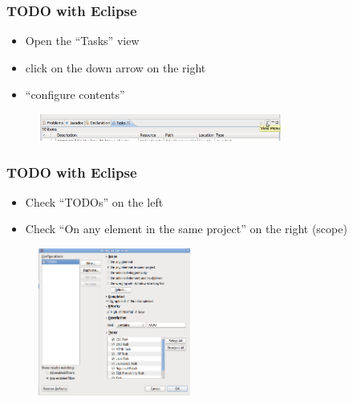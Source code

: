 \begin{frame}
\frametitle{TODO with Eclipse}
\begin{itemize}
 \item Open the ``Tasks'' view 
 \item click on the down arrow on the right
 \item ``configure contents''
\end{itemize}

\begin{figure}
\begin{center}
\includegraphics[width=8cm]{figures/configure-content.png}
\end{center}
\end{figure}

\end{frame}

\begin{frame}
\frametitle{TODO with Eclipse}
\begin{itemize}
 \item Check ``TODOs'' on the left
 \item Check ``On any element in the same project'' on the right (scope)
\end{itemize}

\begin{figure}
\begin{center}
\includegraphics[width=5cm]{figures/content.png}
\end{center}
\end{figure}


\end{frame}